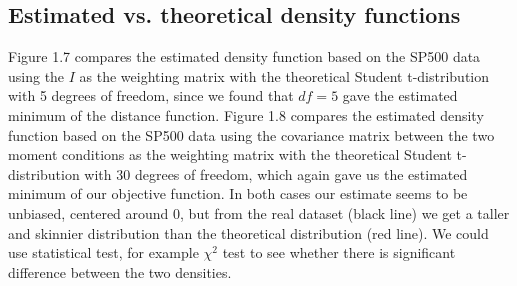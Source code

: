 \subsection{Estimated vs. theoretical density functions}
Figure 1.7 compares the estimated density function based on the SP500 data using the $I$ as the weighting matrix with the theoretical Student t-distribution with 5 degrees of freedom, since we found that $df=5$ gave the estimated minimum of the distance function. Figure 1.8 compares the estimated density function based on the SP500 data using the covariance matrix between the two moment conditions as the weighting matrix with the theoretical Student t-distribution with 30 degrees of freedom, which again gave us the estimated minimum of our objective function. In both cases our estimate seems to be unbiased, centered around 0, but from the real dataset (black line) we get a taller and skinnier distribution than the theoretical distribution (red line). We could use statistical test, for example $\chi^2$ test to see whether there is significant difference between the two densities.




